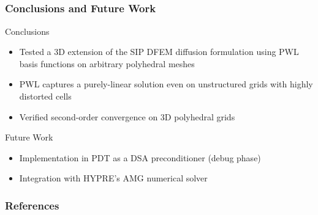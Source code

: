 \documentclass[]{beamer}
\begin{document}
\subsection{}
\begin{frame}[t]\frametitle{Conclusions and Future Work}
	\begin{block}{Conclusions}
		\begin{itemize}
			\item Tested a 3D extension of the SIP DFEM diffusion formulation using PWL basis functions on arbitrary polyhedral meshes
			\item PWL captures a purely-linear solution even on unstructured grids with highly distorted cells
			\item Verified second-order convergence on 3D polyhedral grids
		\end{itemize}
	\end{block}
	\begin{block}{Future Work}
		\begin{itemize}
			\item Implementation in PDT as a DSA preconditioner (debug phase)
			\item Integration with HYPRE's AMG numerical solver
		\end{itemize}
	\end{block}
\end{frame}
\begin{frame}[t]\frametitle{References}

\end{frame}
\end{document}
